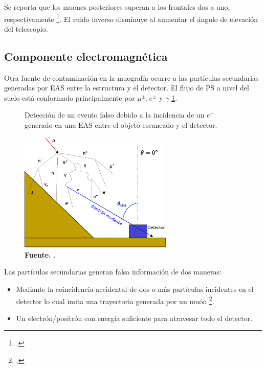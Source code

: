 Se reporta que los muones posteriores superan a los frontales dos a uno, respectivamente \footcite{jourde2013experimental}. El ruido inverso disminuye al aumentar el ángulo de elevación del telescopio. 

\subsection{Componente electromagnética}
 
Otra fuente de contaminación en la muografía ocurre a las partículas secundarias generadas por EAS entre la estructura y el detector. El flujo de PS a nivel del suelo está conformado principalmente por $\mu^{\pm}, e^{\pm}$ y $\gamma$ \ref{EAS}.

\begin{figure}[H]
    \begin{center}
        \caption[Detección de un evento falso debido a la incidencia de un $e^-$ generado en una EAS entre el objeto escaneado y el detector]{Detección de un evento falso debido a la incidencia de un $e^-$ generado en una EAS entre el objeto escaneado y el detector.}
        \includegraphics[width=0.65\textwidth]{Figures/imagenes/EAS.eps}
        \caption*{\textbf{Fuente.} \cite{jesusP}. }
        \label{EAS}
    \end{center}
\end{figure}

Las partículas secundarias generan falsa información de dos maneras:

\begin{itemize}
    \item Mediante la coincidencia accidental de dos o más partículas incidentes en el detector lo cual imita una trayectoria generada por un muón \footcite{KUSAGAYA2015}.
    
    \item Un electrón/positrón con energía suficiente para atravesar todo el detector.
\end{itemize}
    
